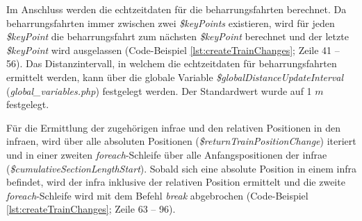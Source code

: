 Im Anschluss werden die \Gls{echtzeitdaten} für die \Gls{beharrungsfahrt}en berechnet. Da \Gls{beharrungsfahrt}en immer zwischen zwei \textit{\$keyPoints} existieren, wird für jeden \textit{\$keyPoint} die \Gls{beharrungsfahrt} zum nächsten \textit{\$keyPoint} berechnet und der letzte \textit{\$keyPoint} wird ausgelassen (Code-Beispiel \ref{lst:createTrainChanges}; Zeile 41 -- 56). Das Distanzintervall, in welchem die \Gls{echtzeitdaten} für \Gls{beharrungsfahrt}en ermittelt werden, kann über die globale Variable \textit{\$globalDistanceUpdateInterval} (\textit{global\_variables.php}) festgelegt werden. Der Standardwert wurde auf 1 $m$ festgelegt.

Für die Ermittlung der zugehörigen \ac{infra}e und den relativen Positionen in den \ac{infra}en, wird über alle absoluten Positionen (\textit{\$returnTrainPositionChange}) iteriert und in einer zweiten \textit{foreach}-Schleife über alle Anfangspositionen der \ac{infra}e (\textit{\$cumulativeSectionLengthStart}). Sobald sich eine absolute Position in einem \ac{infra} befindet, wird der \ac{infra} inklusive der relativen Position ermittelt und die zweite \textit{foreach}-Schleife wird mit dem Befehl \textit{break} abgebrochen (Code-Beispiel \ref{lst:createTrainChanges}; Zeile 63 -- 96).
